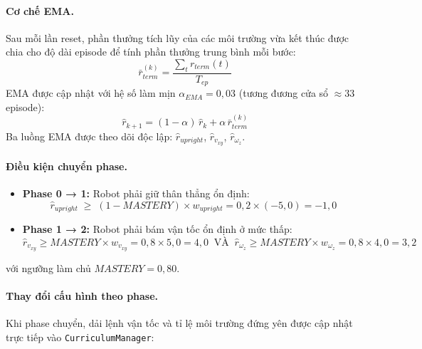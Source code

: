 \paragraph{Cơ chế EMA.}
Sau mỗi lần reset, phần thưởng tích lũy của các môi trường vừa kết thúc
được chia cho độ dài episode để tính phần thưởng trung bình mỗi bước:
\begin{equation}
    \bar{r}_{term}^{(k)} = \frac{\sum_{t} r_{term}(t)}{T_{ep}}
    \label{eq:per_step_reward}
\end{equation}
EMA được cập nhật với hệ số làm mịn $\alpha_{EMA} = 0{,}03$
(tương đương cửa sổ $\approx 33$ episode):
\begin{equation}
    \hat{r}_{k+1} = (1 - \alpha)\,\hat{r}_k + \alpha\,\bar{r}_{term}^{(k)}
    \label{eq:ema_update}
\end{equation}
Ba luồng EMA được theo dõi độc lập: $\hat{r}_{upright}$, $\hat{r}_{v_{xy}}$,
$\hat{r}_{\omega_z}$.

\paragraph{Điều kiện chuyển phase.}
\begin{itemize}
    \item \textbf{Phase 0 → 1:} Robot phải giữ thân thẳng ổn định:
    \begin{equation}
        \hat{r}_{upright} \;\geq\; (1 - \mathit{MASTERY}) \times w_{upright}
        = 0{,}2 \times (-5{,}0) = -1{,}0
        \label{eq:phase01}
    \end{equation}

    \item \textbf{Phase 1 → 2:} Robot phải bám vận tốc ổn định ở mức thấp:
    \begin{equation}
        \hat{r}_{v_{xy}} \geq \mathit{MASTERY} \times w_{v_{xy}} = 0{,}8 \times 5{,}0 = 4{,}0
        \;\;\text{VÀ}\;\;
        \hat{r}_{\omega_z} \geq \mathit{MASTERY} \times w_{\omega_z} = 0{,}8 \times 4{,}0 = 3{,}2
        \label{eq:phase12}
    \end{equation}
\end{itemize}
với ngưỡng làm chủ $\mathit{MASTERY} = 0{,}80$.

\paragraph{Thay đổi cấu hình theo phase.}
Khi phase chuyển, dải lệnh vận tốc và tỉ lệ môi trường đứng yên
được cập nhật trực tiếp vào \texttt{CurriculumManager}:

